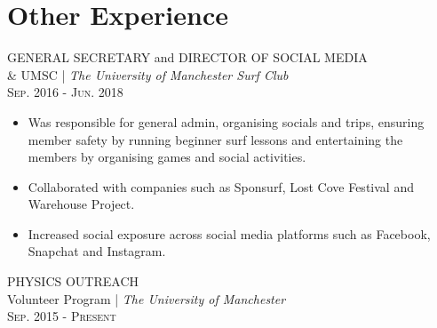 \documentclass[a4paper,10pt]{article}
\begin{document}

\section{Other Experience}

 GENERAL SECRETARY and DIRECTOR OF SOCIAL MEDIA \\&
 UMSC | \small\emph{The University of Manchester Surf Club} \\
 \textsc{Sep.} 2016 -  \textsc{Jun.} 2018
 \vspace{0.1mm}

\begin{itemize}[leftmargin=*,topsep=0pt,noitemsep,parsep=0pt,partopsep=0pt,rightmargin=0.5cm]
 \setlength\itemsep{0em}
    \item Was responsible for general admin, organising socials and trips, ensuring member safety by running beginner surf lessons and entertaining the members by organising games and social activities.
    \item Collaborated with companies such as Sponsurf, Lost Cove Festival and Warehouse Project.
    \item Increased social exposure across social media platforms such as Facebook, Snapchat and Instagram.

    
\end{itemize}

\textsc PHYSICS OUTREACH \\
Volunteer Program | \small\emph{The University of Manchester} \\
\textsc{Sep.} 2015 - \textsc{Present} 
\vspace{0.1mm}
 
\end{document}
